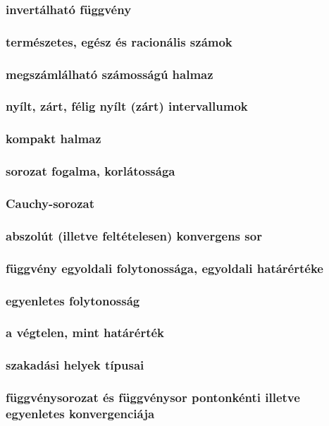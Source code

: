 \documentclass[12pt]{article}
\begin{document}
\subsubsection{invertálható függvény}
\subsubsection{természetes, egész és racionális számok}
\subsubsection{megszámlálható számosságú halmaz}
\subsubsection{nyílt, zárt, félig nyílt (zárt) intervallumok}
\subsubsection{kompakt halmaz}
\subsubsection{sorozat fogalma, korlátossága}
\subsubsection{Cauchy-sorozat}
\subsubsection{abszolút (illetve feltételesen) konvergens sor}
\subsubsection{függvény egyoldali folytonossága,
egyoldali határértéke}
\subsubsection{egyenletes folytonosság}
\subsubsection{a végtelen, mint határérték}
\subsubsection{szakadási helyek típusai}
\subsubsection{függvénysorozat és függvénysor pontonkénti illetve egyenletes konvergenciája}
\end{document}
